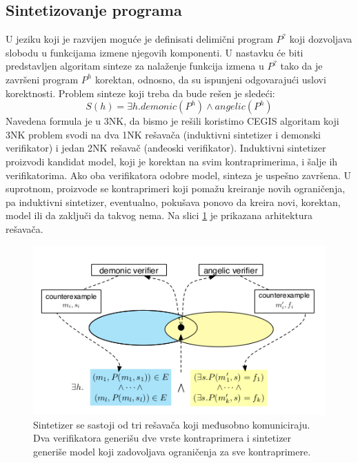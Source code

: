 \documentclass[a4paper]{article}
\begin{document}
\subsection{Sintetizovanje programa}
U jeziku koji je razvijen moguće je definisati delimični program $P^?$ koji dozvoljava slobodu u funkcijama izmene njegovih komponenti. U nastavku će biti predstavljen algoritam sinteze za nalaženje funkcija izmena u $P^?$ tako da je završeni program $P^h$ korektan, odnosno, da su ispunjeni odgovarajući uslovi korektnosti. Problem sinteze koji treba da bude rešen je sledeći:
\begin{equation}
S(h) = \exists h.demonic(P^h) \land angelic(P^h)
\end{equation}
Navedena formula je u 3NK, da bismo je rešili koristimo CEGIS algoritam koji 3NK problem svodi na dva 1NK rešavača (induktivni sintetizer i demonski verifikator) i jedan 2NK rešavač (anđeoski verifikator). Induktivni sintetizer proizvodi kandidat model, koji je korektan na svim kontraprimerima, i šalje ih verifikatorima. Ako oba verifikatora odobre model, sinteza je uspešno završena. U suprotnom, proizvode se kontraprimeri koji pomažu kreiranje novih ograničenja, pa induktivni sintetizer, eventualno, pokušava ponovo da kreira novi, korektan, model ili da zaključi da takvog nema. Na slici \ref{fig:solver} je prikazana arhitektura rešavača.

\begin{figure}[h!]
\begin{center}
\includegraphics[scale=0.75]{solverarchitecture.png}
\end{center}
\caption{Sintetizer se sastoji od tri rešavača koji međusobno komuniciraju. Dva verifikatora generišu dve vrste kontraprimera i sintetizer generiše model koji zadovoljava ograničenja za sve kontraprimere.}
\label{fig:solver}
\end{figure}
\end{document}
